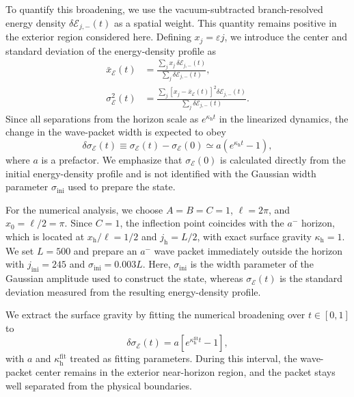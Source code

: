 \documentclass[reprint,amsmath,amssymb,aps,prb,showkeys,superscriptaddress]{revtex4-2}
\begin{document}
To quantify this broadening, we use the vacuum-subtracted
branch-resolved energy density
$\delta\mathcal{E}_{j,-}(t)$ as a spatial weight. This quantity
remains positive in the exterior region considered here. Defining
$x_j=\varepsilon j$, we introduce the center and standard deviation
of the energy-density profile as
\begin{align}
  \bar{x}_{\mathcal E}(t)
  &=
  \frac{
    \displaystyle
    \sum_j
    x_j\,
    \delta\mathcal{E}_{j,-}(t)
  }{
    \displaystyle
    \sum_j
    \delta\mathcal{E}_{j,-}(t)
  },
  \label{eq:energy_center}
  \\
  \sigma_{\mathcal E}^2(t)
  &=
  \frac{
    \displaystyle
    \sum_j
    \left[
      x_j-\bar{x}_{\mathcal E}(t)
    \right]^2
    \delta\mathcal{E}_{j,-}(t)
  }{
    \displaystyle
    \sum_j
    \delta\mathcal{E}_{j,-}(t)
  }.
  \label{eq:energy_width}
\end{align}
Since all separations from the horizon scale as
$e^{\kappa_{\mathrm h}t}$ in the linearized dynamics, the change in
the wave-packet width is expected to obey
\begin{equation}
  \delta\sigma_{\mathcal E}(t)
  \equiv
  \sigma_{\mathcal E}(t)
  -
  \sigma_{\mathcal E}(0)
  \simeq
  a\left(
    e^{\kappa_{\mathrm h}t}-1
  \right),
  \label{eq:sigma_kappa}
\end{equation}
where $a$ is a prefactor. We emphasize that
$\sigma_{\mathcal E}(0)$ is calculated directly from the initial
energy-density profile and is not identified with the Gaussian
width parameter $\sigma_{\mathrm{ini}}$ used to prepare the state.

For the numerical analysis, we choose
$A=B=C=1$, $\ell=2\pi$, and $x_0=\ell/2=\pi$.
Since $C=1$, the inflection point coincides with the $a^-$ horizon,
which is located at
$x_{\mathrm h}/\ell=1/2$ and
$j_{\mathrm h}=L/2$, with exact surface gravity
$\kappa_{\mathrm h}=1$. We set $L=500$ and prepare an $a^-$ wave
packet immediately outside the horizon with
$j_{\mathrm{ini}}=245$ and
$\sigma_{\mathrm{ini}}=0.003L$.
Here, $\sigma_{\mathrm{ini}}$ is the width parameter of the
Gaussian amplitude used to construct the state, whereas
$\sigma_{\mathcal E}(t)$ is the standard deviation measured from
the resulting energy-density profile.

We extract the surface gravity by fitting the numerical broadening
over $t\in[0,1]$ to
\begin{equation}
  \delta\sigma_{\mathcal E}(t)
  =
  a\left[
    e^{\kappa_{\mathrm h}^{\mathrm{fit}}t}-1
  \right],
  \label{eq:surface_gravity_fit}
\end{equation}
with $a$ and $\kappa_{\mathrm h}^{\mathrm{fit}}$ treated as fitting
parameters. During this interval, the wave-packet center remains in
the exterior near-horizon region, and the packet stays well
separated from the physical boundaries.
\end{document}
